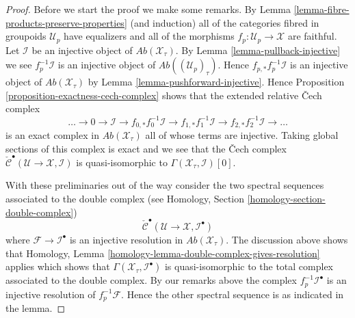 \documentclass[10pt,a4paper]{amsart}
\theoremstyle{plain}
\theoremstyle{definition}
\theoremstyle{remark}
\numberwithin{equation}{subsection}
\begin{document}
\begin{proof}
Before we start the proof we make some remarks. By
Lemma \ref{lemma-fibre-products-preserve-properties}
(and induction) all of the categories fibred in groupoids $\mathcal{U}_p$
have equalizers and all of the morphisms $f_p : \mathcal{U}_p \to \mathcal{X}$
are faithful. Let $\mathcal{I}$ be an injective object
of $\textit{Ab}(\mathcal{X}_\tau)$. By
Lemma \ref{lemma-pullback-injective}
we see $f_p^{-1}\mathcal{I}$ is an injective object of
$\textit{Ab}((\mathcal{U}_p)_\tau)$.
Hence $f_{p, *}f_p^{-1}\mathcal{I}$ is an injective object of
$\textit{Ab}(\mathcal{X}_\tau)$ by
Lemma \ref{lemma-pushforward-injective}.
Hence
Proposition \ref{proposition-exactness-cech-complex}
shows that the extended relative {\v C}ech complex
$$
\ldots \to 0 \to
\mathcal{I} \to
f_{0, *}f_0^{-1}\mathcal{I} \to
f_{1, *}f_1^{-1}\mathcal{I} \to
f_{2, *}f_2^{-1}\mathcal{I} \to \ldots
$$
is an exact complex in $\textit{Ab}(\mathcal{X}_\tau)$ all of whose
terms are injective. Taking global sections of this complex is exact
and we see that the {\v C}ech complex
$\check{\mathcal{C}}^\bullet(\mathcal{U} \to \mathcal{X}, \mathcal{I})$
is quasi-isomorphic to $\Gamma(\mathcal{X}_\tau, \mathcal{I})[0]$.

\medskip\noindent
With these preliminaries out of the way consider the two spectral sequences
associated to the double complex (see
Homology, Section \ref{homology-section-double-complex})
$$
\check{\mathcal{C}}^\bullet(\mathcal{U} \to \mathcal{X}, \mathcal{I}^\bullet)
$$
where $\mathcal{F} \to \mathcal{I}^\bullet$ is an injective resolution
in $\textit{Ab}(\mathcal{X}_\tau)$.
The discussion above shows that
Homology, Lemma \ref{homology-lemma-double-complex-gives-resolution}
applies which shows that
$\Gamma(\mathcal{X}_\tau, \mathcal{I}^\bullet)$
is quasi-isomorphic to the total complex associated to the double complex.
By our remarks above the complex $f_p^{-1}\mathcal{I}^\bullet$ is an
injective resolution of $f_p^{-1}\mathcal{F}$. Hence the other spectral
sequence is as indicated in the lemma.
\end{proof}
\end{document}
